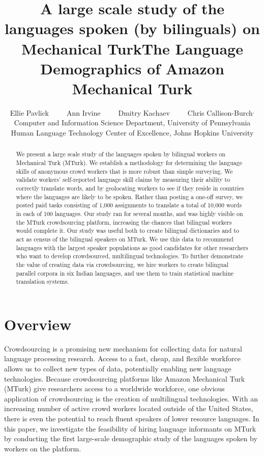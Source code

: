\documentclass[11pt]{article}
\title{A large scale study of the languages spoken (by bilinguals) on Mechanical Turk}
\title{The Language Demographics of  Amazon Mechanical Turk}
\author{Ellie Pavlick\affliationPenn \ \ \ \ \ Ann Irvine\affliationJHU  \ \ \ \ \ Dmitry Kachaev\affliationJHU  \ \ \ \ \  Chris Callison-Burch\affliationPenn$^{,}$\affliationJHU \\
\affliationPenn Computer and Information Science Department, University of Pennsylvania \\
\affliationJHU Human Language Technology Center of Excellence, Johns Hopkins University \\
  }
\author{}
\date{}
\begin{document}
\maketitle

\begin{abstract}
We present a large scale study of the languages spoken by bilingual workers on Mechanical Turk (MTurk).  
We establish a  methodology for determining the language skills of anonymous crowd workers that is more robust than simple surveying.  We validate workers' self-reported language skill claims by measuring their ability to correctly translate words, and by geolocating workers to see if they reside in countries where the languages are likely to be spoken. Rather than posting a one-off survey, we posted paid tasks consisting of 1,000 assignments to translate a total of 10,000 words in each of 100 languages.  Our study ran for several months, and was highly visible on the MTurk crowdsourcing platform, increasing the chances that bilingual workers would complete it.  Our study was useful both to create bilingual dictionaries and to act as census of the bilingual speakers on MTurk.  We use this data to recommend languages with the largest speaker populations as good candidates for other researchers who want to  develop crowdsourced, multilingual technologies. To further demonstrate the value of creating data via crowdsourcing, we hire workers to create bilingual parallel corpora in six Indian languages, and use them to train statistical machine translation systems. 

\end{abstract}

\section{Overview}
Crowdsourcing is a promising new mechanism for collecting data for natural language processing research. Access to a fast, cheap, and flexible workforce allows us to collect new types of data, potentially enabling new language technologies.
Because crowdsourcing platforms like Amazon Mechanical Turk (MTurk) give researchers access to a worldwide workforce, one obvious application of crowdsourcing is the creation of multilingual technologies. 
With an increasing number of active crowd workers located outside of the United States, there is even the potential to reach fluent speakers of lower resource languages.
In this paper, we investigate the feasibility of hiring language informants on MTurk by conducting the first large-scale demographic study of the languages spoken by workers on the platform. 
\end{document}
